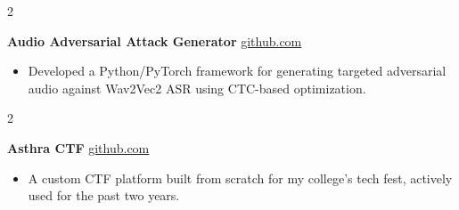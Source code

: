 \documentclass[10pt, a4paper]{article}
\newenvironment{highlights}{
    \begin{itemize}[
        topsep=0.10 cm,
        parsep=0.10 cm,
        partopsep=0pt,
        itemsep=0pt,
        leftmargin=0 cm + 10pt
    ]
}{
    \end{itemize}
} %
\newenvironment{twocolentry}[2][]{
    \onecolentry
    \def\secondColumn{#2}
    \setcolumnwidth{\fill, 4.5 cm}
    \begin{paracol}{2}
}{
    \switchcolumn \raggedleft \secondColumn
    \end{paracol}
    \endonecolentry
} %
\begin{document}
            \begin{twocolentry}{
            \href{https://github.com/TimsTittus/Audio-Adversarial-Attack-Generator}{github.com}
        }
            \textbf{Audio Adversarial Attack Generator}\end{twocolentry}

        \vspace{0.01 cm}
        
            \begin{highlights}
                \item Developed a Python/PyTorch framework for generating targeted adversarial audio against Wav2Vec2 ASR using CTC-based optimization.
            \end{highlights}

        \vspace{0.01 cm}
        
        \begin{twocolentry}{
            \href{https://github.com/TimsTittus/asthra-ctf}{github.com}
        }
            \textbf{Asthra CTF}\end{twocolentry}

        \vspace{0.01 cm}
        
            \begin{highlights}
                \item A custom CTF platform built from scratch for my college’s tech fest, actively used for the past two years.
            \end{highlights}
\end{document}
